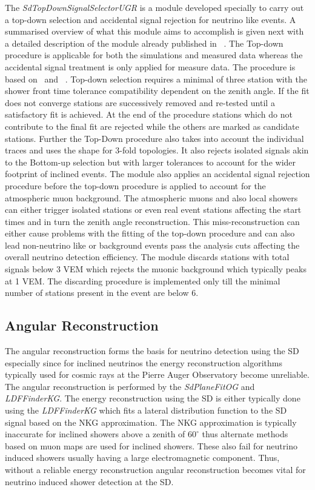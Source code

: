The \textit{SdTopDownSignalSelectorUGR} is a module developed specially to carry out a top-down selection and accidental signal rejection for neutrino like events. A summarised overview of what this module aims to accomplish is given next with a detailed description of the module already published in ~\cite{}. The Top-down procedure is applicable for both the simulations and measured data whereas the accidental signal treatment is only applied for measure data. The procedure is based on~\cite{} and ~\cite{}. Top-down selection requires a minimal of three station with the shower front time tolerance compatibility dependent on the zenith angle. If the fit does not converge stations are successively removed and re-tested until a satisfactory fit is achieved. At the end of the procedure stations which do not contribute to the final fit are rejected while the others are marked as candidate stations. Further the Top-Down procedure also takes into account the individual traces and uses the shape for 3-fold topologies. It also rejects isolated signals akin to the Bottom-up selection but with larger tolerances to account for the wider footprint of inclined events. The module also applies an accidental signal rejection procedure before the top-down procedure is applied to account for the atmospheric muon background. The atmospheric muons and also local showers can either trigger isolated stations or even real event stations affecting the start times and in turn the zenith angle reconstruction. This miss-reconstruction can either cause problems with the fitting of the top-down procedure and can also lead non-neutrino like or background events pass the analysis cuts affecting the overall neutrino detection efficiency. The module discards stations with total signals below 3 VEM which rejects the muonic background which typically peaks at 1 VEM. The discarding procedure is implemented only till the minimal number of stations present in the event are below 6. 


\subsection{Angular Reconstruction}
\label{subsec:reco_presel}

The angular reconstruction forms the basis for neutrino detection using the SD especially since for inclined neutrinos the energy reconstruction algorithms typically used for cosmic rays at the Pierre Auger Observatory become unreliable. The angular reconstruction is performed by the \textit{SdPlaneFitOG} and \textit{LDFFinderKG}. The energy reconstruction using the SD is either typically done using the \textit{LDFFinderKG} which fits a lateral distribution function to the SD signal based on the NKG approximation. The NKG approximation is typically inaccurate for inclined showers above a zenith of $60^{\circ}$ thus alternate methods based on muon maps are used for inclined showers. These also fail for neutrino induced showers usually having a large electromagnetic component. Thus, without a reliable energy reconstruction angular reconstruction becomes vital for neutrino induced shower detection at the SD. 

